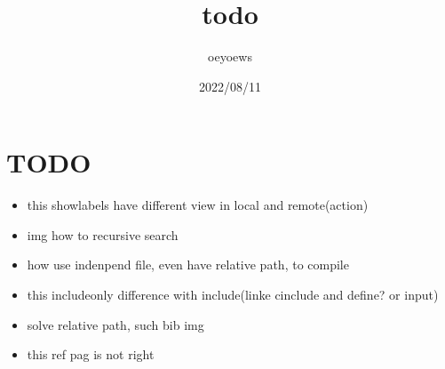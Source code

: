 \documentclass[UTF8]{article}
\title{todo \emoji{check-mark-button}}
\author{oeyoews}
\date{2022/08/11}
\begin{document}
\maketitle

\section{TODO }%
\label{sec:TODO}

\begin{itemize}
	\item this showlabels have different view in local and remote(action)
	\item img how to recursive search
	\item how use indenpend file, even have relative path, to compile
	\item this includeonly difference with include(linke cinclude and define? or
	      input)
	\item solve relative path, such bib img
	\item this ref pag is not right
\end{itemize}
\end{document}
